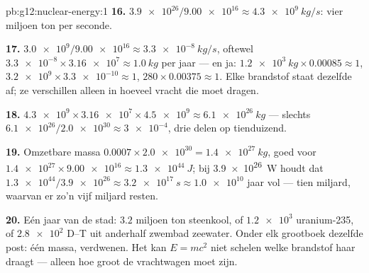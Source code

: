 \begin{solution}{pb:g12:nuclear-energy:1}
\textbf{16.} $\num{3.9e26}/\num{9.00e16} \approx \qty{4.3e9}{kg/s}$: vier
miljoen ton per seconde.

\textbf{17.} $\num{3.0e9}/\num{9.00e16} \approx \qty{3.3e-8}{kg/s}$, oftewel
$\num{3.3e-8} \times \num{3.16e7} \approx \qty{1.0}{kg}$ per jaar --- en ja:
$\qty{1.2e3}{kg} \times 0.00085 \approx 1$, $\num{3.2e9}
\times \num{3.3e-10} \approx 1$, $280 \times 0.00375 \approx 1$. Elke
brandstof staat dezelfde  af; ze verschillen alleen in hoeveel vracht
die moet dragen.

\textbf{18.} $\num{4.3e9} \times \num{3.16e7} \times \num{4.5e9}
\approx \qty{6.1e26}{kg}$ --- slechts $\num{6.1e26}/\num{2.0e30} \approx
\num{3e-4}$, drie delen op tienduizend.

\textbf{19.} Omzetbare massa $0.0007 \times \num{2.0e30} =
\qty{1.4e27}{kg}$, goed voor $\num{1.4e27} \times \num{9.00e16} \approx
\qty{1.3e44}{J}$; bij \qty{3.9e26}{W} houdt dat $\num{1.3e44}/
\num{3.9e26} \approx \qty{3.2e17}{s} \approx \num{1.0e10}$ jaar vol --- tien
miljard, waarvan er zo'n vijf miljard resten.

\textbf{20.} Eén jaar van de stad: $3.2$ miljoen ton steenkool, of
$\num{1.2e3}$  uranium-235, of $\num{2.8e2}$  D--T uit
anderhalf zwembad zeewater. Onder elk grootboek dezelfde post: één 
massa, verdwenen. Het kan $E = mc^2$ niet schelen welke brandstof haar draagt
--- alleen hoe groot de vrachtwagen moet zijn.
\end{solution}
